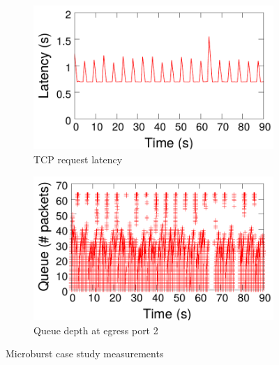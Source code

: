 \begin{figure}[!t]
\centering
\begin{subfigure}[t]{0.48\columnwidth}
\raggedright
\includegraphics[width=\linewidth]{pq_fetch_latency.pdf}
\vspace{-0.2in}
\caption{TCP request latency}
\label{fig:mininet-latency}
\end{subfigure}
\begin{subfigure}[t]{0.48\columnwidth}
\raggedleft
\includegraphics[width=\linewidth]{pq_queue_sizes.pdf}
\vspace{-0.2in}
\caption{Queue depth at egress port 2}
\label{fig:mininet-qin}
\end{subfigure}
\vspace{-0.1in}
\caption{Microburst case study measurements}
\end{figure}
